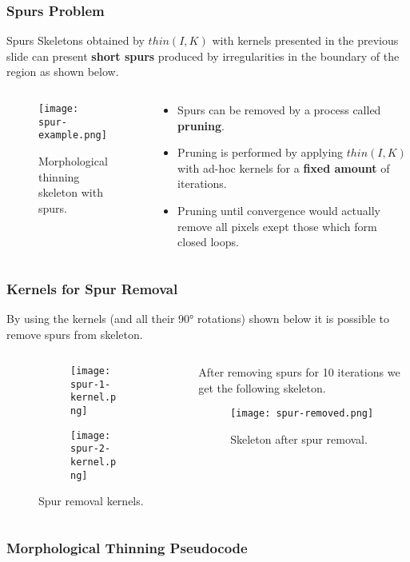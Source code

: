 \begin{frame}
  \frametitle{Spurs Problem}
  \begin{block}{Spurs}
    Skeletons obtained by $thin(I, K)$ with kernels presented in the previous slide can present \textbf{short spurs} produced by irregularities in the boundary of the region as shown below.
  \end{block}
  \begin{columns}
    \begin{column}{0.4\textwidth}
      \begin{figure}
        \texttt{[image: spur-example.png]}
        \caption{Morphological thinning skeleton with spurs.}
      \end{figure}
    \end{column}
    \begin{column}{0.6\textwidth}
      \begin{itemize}
        \item Spurs can be removed by a process called \textbf{pruning}.
        \item Pruning is performed by applying $thin(I, K)$ with ad-hoc kernels for a \textbf{fixed amount} of iterations.
        \item Pruning until convergence would actually remove all pixels exept those which form closed loops.
      \end{itemize}
    \end{column}
  \end{columns}
\end{frame}

\begin{frame}
  \frametitle{Kernels for Spur Removal}
  By using the kernels (and all their 90° rotations) shown below it is possible to remove spurs from skeleton.
  \begin{columns}
    \begin{column}{0.5\textwidth}
      \begin{figure}
        \centering
        \begin{subfigure}[b]{0.5\textwidth}
          \centering
          \texttt{[image: spur-1-kernel.png]}
        \end{subfigure}
        \hfill
        \begin{subfigure}[b]{0.5\textwidth}
          \centering
          \texttt{[image: spur-2-kernel.png]}
        \end{subfigure}
        \caption{Spur removal kernels.}
      \end{figure}
    \end{column}
    \begin{column}{0.5\textwidth}
      After removing spurs for 10 iterations we get the following skeleton.
      \begin{figure}
        \texttt{[image: spur-removed.png]}
        \caption{Skeleton after spur removal.}
      \end{figure}
    \end{column}
  \end{columns}
\end{frame}

\begin{frame}
  \frametitle{Morphological Thinning Pseudocode}
  
\end{frame}
